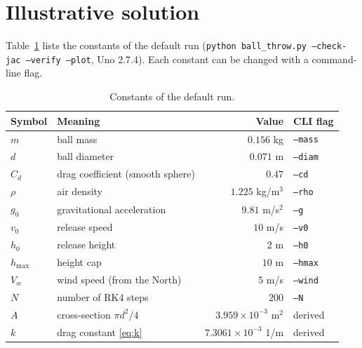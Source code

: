 \documentclass[11pt]{article}
\begin{document}
\section{Illustrative solution}

Table~\ref{tab:const} lists the constants of the default run
(\texttt{python ball\_throw.py --check-jac --verify --plot}, Uno 2.7.4).
Each constant can be changed with a command-line flag.

\begin{table}[h]
\centering
\begin{tabular}{llrl}
\toprule
Symbol & Meaning & Value & CLI flag\\
\midrule
$m$ & ball mass & $0.156$ kg & \texttt{--mass}\\
$d$ & ball diameter & $0.071$ m & \texttt{--diam}\\
$C_d$ & drag coefficient (smooth sphere) & $0.47$ & \texttt{--cd}\\
$\rho$ & air density & $1.225$ kg/m$^3$ & \texttt{--rho}\\
$g_0$ & gravitational acceleration & $9.81$ m/s$^2$ & \texttt{--g}\\
$v_0$ & release speed & $10$ m/s & \texttt{--v0}\\
$h_0$ & release height & $2$ m & \texttt{--h0}\\
$h_{\max}$ & height cap & $10$ m & \texttt{--hmax}\\
$V_w$ & wind speed (from the North) & $5$ m/s & \texttt{--wind}\\
$N$ & number of RK4 steps & $200$ & \texttt{--N}\\
\midrule
$A$ & cross-section $\pi d^2/4$ & $3.959\times10^{-3}$ m$^2$ & derived\\
$k$ & drag constant \eqref{eq:k} & $7.3061\times10^{-3}$ 1/m & derived\\
\bottomrule
\end{tabular}
\caption{Constants of the default run.}\label{tab:const}
\end{table}
\end{document}
